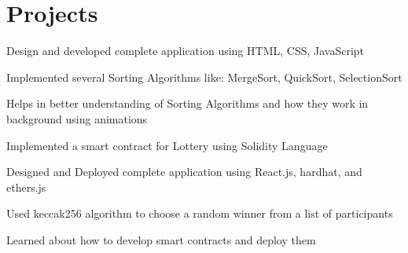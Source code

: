\documentclass[letterpaper]{deedy-resume} %
\begin{document}
\hfill
%
%
\begin{minipage}[t]{0.56\textwidth} %


\section{Projects}


\vspace{\topsep} %
\begin{tightitemize}
\item Design and developed complete application using HTML, CSS, JavaScript
\item Implemented several Sorting Algorithms like: MergeSort, QuickSort, SelectionSort
\item Helps in better understanding of Sorting Algorithms and how they work in background using animations
\end{tightitemize}

\sectionspace %


\begin{tightitemize}
\item Implemented a smart contract for Lottery using Solidity Language
\item Designed and Deployed complete application using React.js, hardhat, and ethers.js
\item Used keccak256 algorithm to choose a random winner from a list of participants
\item Learned about how to develop smart contracts and deploy them
\end{tightitemize}

\sectionspace %




\end{minipage}
\end{document}
